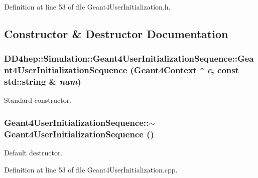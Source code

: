 Definition at line 53 of file Geant4UserInitialization.h.

\subsection{Constructor \& Destructor Documentation}
\hypertarget{class_d_d4hep_1_1_simulation_1_1_geant4_user_initialization_sequence_a98a41e1dc518fea9eb882df8b2f62e0d}{
\subsubsection[{Geant4UserInitializationSequence}]{\setlength{\rightskip}{0pt plus 5cm}DD4hep::Simulation::Geant4UserInitializationSequence::Geant4UserInitializationSequence ({\bf Geant4Context} $\ast$ {\em c}, \/  const std::string \& {\em nam})}}
\label{class_d_d4hep_1_1_simulation_1_1_geant4_user_initialization_sequence_a98a41e1dc518fea9eb882df8b2f62e0d}


Standard constructor. \hypertarget{class_d_d4hep_1_1_simulation_1_1_geant4_user_initialization_sequence_aa593a6ec771aea3c621f4da1cb2beaf6}{
\subsubsection[{$\sim$Geant4UserInitializationSequence}]{\setlength{\rightskip}{0pt plus 5cm}Geant4UserInitializationSequence::$\sim$Geant4UserInitializationSequence ()}}
\label{class_d_d4hep_1_1_simulation_1_1_geant4_user_initialization_sequence_aa593a6ec771aea3c621f4da1cb2beaf6}


Default destructor. 

Definition at line 53 of file Geant4UserInitialization.cpp.


